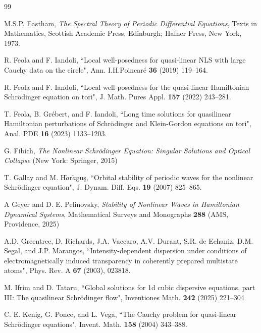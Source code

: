 \documentclass[12pt,reqno]{amsart}
\numberwithin{equation}{section}
\numberwithin{figure}{section}
\begin{document}
\begin{thebibliography}{99}
		
 M.S.P. Eastham, \textit{The Spectral Theory of Periodic Differential Equations}, Texts in Mathematics, Scottish Academic Press, Edinburgh; Hafner Press, New York, 1973. 

 R. Feola and F. Iandoli, ``Local well-posedness for quasi-linear NLS with large Cauchy data on the circle", Ann. I.H.Poincar\'{e} {\bf 36} (2019) 119--164.

 R. Feola and F. Iandoli, ``Local well-posedness for the quasi-linear Hamiltonian Schr\"{o}dinger equation on tori", J. Math. Pures Appl. {\bf 157} (2022) 243--281.
		
 T. Feola, B. Gr\'{e}bert, and F. Iandoli, 
``Long time solutions for quasilinear Hamiltonian perturbations of Schr\"{o}dinger and Klein-Gordon equations on tori", 
Anal. PDE {\bf 16} (2023) 1133--1203.
		
 G. Fibich, {\em The Nonlinear Schrödinger Equation: Singular Solutions and Optical Collapse} (New York: Springer, 2015)

 T. Gallay and M. H$\check{a}$r$\check{a}$gu\c{s}, ``Orbital stability of periodic waves for the nonlinear Schr\"{o}dinger equation",  J. Dynam. Diff. Eqs. {\bf 19} (2007) 825--865.

 A Geyer and D. E. Pelinovsky, {\em Stability of Nonlinear Waves in Hamiltonian Dynamical Systems}, Mathematical Surveys and Monographs {\bf 288} (AMS, Providence, 2025)

 A.D. Greentree, D. Richards, J.A. Vaccaro,
A.V. Durant, S.R. de Echaniz, D.M. Segal, and J.P. Marangos,
``Intensity-dependent dispersion under conditions of
electromagnetically induced transparency in coherently prepared
multistate atoms", Phys. Rev. A {\bf 67} (2003), 023818.
		

	 M. Ifrim and D. Tataru, ``Global solutions for 1d cubic dispersive equations, part III: The quasilinear
Schr\"{o}dinger flow", Inventiones Math. {\bf 242} (2025) 221--304
			
		
 C. E. Kenig, G. Ponce, and L. Vega, ``The Cauchy problem for quasi-linear Schr\"{o}dinger equations", Invent. Math. {\bf 158} (2004)  343--388.		


\end{thebibliography}
\end{document}
